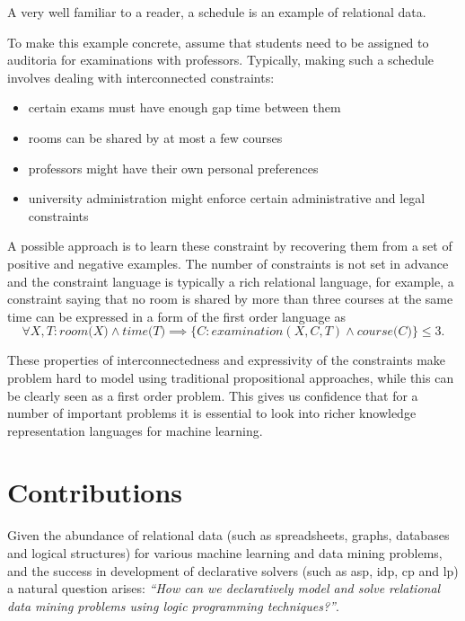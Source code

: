 A very well familiar to a reader, a schedule is an example
of relational data. 
\begin{example}
To make this example concrete, assume that students need to be assigned to
auditoria for examinations with professors. Typically, making such a
schedule involves dealing with interconnected constraints:
    \begin{itemize} 
    \item certain exams
must have enough gap time between them 
    \item rooms can be shared by at most
    a few courses 
\item professors might have their own personal preferences
\item university administration might enforce certain administrative and 
legal constraints 
    \end{itemize} 
    
    A possible approach is to learn these 
constraint by recovering them from
a set of positive and negative examples. The number of constraints is
not set in advance and the constraint language is typically a rich
relational language, for example, a constraint saying that no room is
shared by more than three courses at the same time can be expressed in a form of the first
order language as
\begin{equation*}
    \forall X,T: \textit{room(X)} \wedge \textit{time(T)} \implies \{ C : \textit{examination}(X,C,T) \wedge \textit{course(C)} \} \leq 3.
\end{equation*}
\end{example}

These properties of interconnectedness and expressivity of the constraints make
problem hard to model using traditional propositional approaches,
while this can be clearly seen as a first order problem. This gives us
confidence that for a number of important problems it is essential to
look into richer knowledge representation languages for machine
learning.

\section{Contributions}
Given the abundance of relational data (such as spreadsheets, graphs,
databases and logical structures) for various machine learning and data
mining problems, and the success in development of declarative solvers (such
as \acrshort{asp}, \acrshort{idp}, \acrshort{cp} and \acrshort{lp}) a
natural question arises: \textit{``How can we declaratively model and
solve relational data mining problems using logic programming
techniques?''}. 

